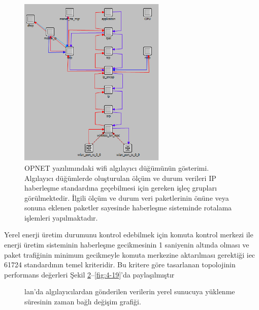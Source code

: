 \begin{figure}[htbp]
\centerline{\includegraphics[width=7cm]{Resim/PV-Sayfa -5.drawio.png}}
\caption{OPNET yazılımındaki \gls{wifi} algılayıcı düğümünün gösterimi. Algılayıcı düğümlerde oluşturulan ölçüm ve durum verileri IP haberleşme standardına geçebilmesi için gereken işleç grupları görülmektedir. İlgili ölçüm ve durum veri paketlerinin önüne veya sonuna eklenen paketler sayesinde haberleşme sisteminde rotalama işlemleri yapılmaktadır.}
\label{fig:4-16}
\end{figure}


Yerel enerji üretim durumunu kontrol edebilmek için komuta kontrol merkezi ile enerji üretim sisteminin haberleşme gecikmesinin 1 saniyenin altında olması ve paket trafiğinin minimum gecikmeyle komuta merkezine aktarılması gerektiği \gls{iec} 61724 standardının temel kriteridir. Bu kritere göre tasarlanan topolojinin performans değerleri Şekil \ref{fig:4-17}--\ref{fig:4-19}’da paylaşılmıştır

\begin{figure}[htbp]

\centering




\caption{\gls{lan}'da algılayıcılardan gönderilen verilerin yerel sunucuya yüklenme süresinin zaman bağlı değişim grafiği.}
\label{fig:4-17}
\end{figure}


